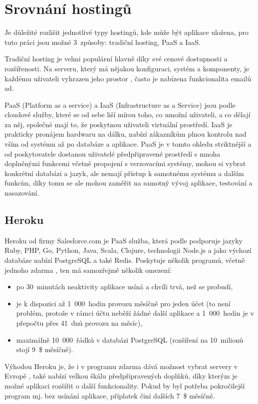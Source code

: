     \section{Srovnání hostingů}
    Je důležité rozlišit jednotlivé typy hostingů, kde může být aplikace uložena, pro tuto práci jsou možné 3~způsoby: tradiční hosting, PaaS a IaaS.
    
    Tradiční hosting je velmi populární hlavně díky své cenové dostupnosti a rozšířenosti. Na serveru, který má nějakou konfiguraci, systém a komponenty, je každému uživateli vyhrazen jeho prostor \cite{hosting2}, často je nabízena funkcionalita emailů ad.
    
    PaaS (Platform as a service) a IaaS (Infrastructure as a Service) jsou podle \cite{hosting1} cloudové služby, které se od sebe liší mírou toho, co umožní uživateli, a co dělají za něj, společné mají to, že poskytnou uživateli virtuální prostředí. IaaS je prakticky pronájem hardwaru na dálku, nabízí zákazníkům plnou kontrolu nad vším od systému až po databáze a aplikace. PaaS je v tomto ohledu striktnější a od poskytovatele dostanou uživatelé předpřipravené prostředí s mnoha doplněnými funkcemi včetně propojení s verzovacími systémy, mohou si vybrat konkrétní databázi a jazyk, ale nemají přístup k samotnému systému a dalším funkcím, díky tomu se ale mohou zaměřit na samotný vývoj aplikace, testování a nasazování.
    
        \subsection{Heroku}\label{heroku}
        Heroku od firmy Salesforce.com je PaaS služba, která podle \cite{heroku1} podporuje jazyky Ruby, PHP, Go, Python, Java, Scala, Clojure, technologii Node.js a jako výchozí databáze nabízí PostgreSQL a také Redis. Poskytuje několik programů, včetně jednoho zdarma \cite{heroku2}, ten má samozřejmě několik omezení:
            \begin{itemize}
                \item po 30~minutách neaktivity aplikace usíná a chvíli trvá, než se probudí,
                \item je k dispozici až 1~000~hodin provozu měsíčně pro jeden účet (to není problém, protože v rámci účtu neběží žádné další aplikace a 1~000~hodin je v přepočtu přes 41~dnů provozu na měsíc),
                \item maximálně 10~000~řádků v databázi PostgreSQL (rozšíření na 10~milionů stojí 9~\$ měsíčně).
            \end{itemize}
        Výhodou Heroku je, že i v programu zdarma dává možnost vybrat servery v Evropě \cite{heroku3}, také nabízí velkou škálu předpřipravených doplňků, díky kterým je možné aplikaci rozšířit o další funkcionality. Pokud by byl potřeba pokročilejší program mj. bez usínání aplikace, příplatek činí dalších 7~\$ měsíčně.
        
